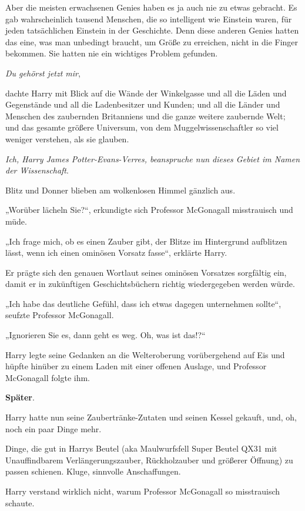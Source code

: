 {Aber die meisten erwachsenen Genies haben es ja auch nie zu etwas gebracht. Es gab wahrscheinlich tausend Menschen, die so intelligent wie Einstein waren, für jeden tatsächlichen Einstein in der Geschichte. Denn diese anderen Genies hatten das eine, was man unbedingt braucht, um Größe zu erreichen, nicht in die Finger bekommen. Sie hatten nie ein wichtiges Problem gefunden.

\emph{Du gehörst jetzt mir},

dachte Harry mit Blick auf die Wände der Winkelgasse und all die Läden und Gegenstände und all die Ladenbesitzer und Kunden; und all die Länder und Menschen des zaubernden Britanniens und die ganze weitere zaubernde Welt; und das gesamte größere Universum, von dem Muggelwissenschaftler so viel weniger verstehen, als sie glauben.

\emph{Ich, Harry James Potter-Evans-Verres, beanspruche nun dieses Gebiet im Namen der Wissenschaft}.

Blitz und Donner blieben am wolkenlosen Himmel gänzlich aus.

„Worüber lächeln Sie?“, erkundigte sich Professor McGonagall misstrauisch und müde.

„Ich frage mich, ob es einen Zauber gibt, der Blitze im Hintergrund aufblitzen lässt, wenn ich einen ominösen Vorsatz fasse“, erklärte Harry.

Er prägte sich den genauen Wortlaut seines ominösen Vorsatzes sorgfältig ein, damit er in zukünftigen Geschichtsbüchern richtig wiedergegeben werden würde.

„Ich habe das deutliche Gefühl, dass ich etwas dagegen unternehmen sollte“, seufzte Professor McGonagall.

„Ignorieren Sie es, dann geht es weg. Oh, was ist das!?“

Harry legte seine Gedanken an die Welteroberung vorübergehend auf Eis und hüpfte hinüber zu einem Laden mit einer offenen Auslage, und Professor McGonagall folgte ihm.

\textbf{Später}.

Harry hatte nun seine Zaubertränke-Zutaten und seinen Kessel gekauft, und, oh, noch ein paar Dinge mehr.

Dinge, die gut in Harrys Beutel (aka Maulwurfsfell Super Beutel QX31 mit Unauffindbarem Verlängerungszauber, Rückholzauber und größerer Öffnung) zu passen schienen. Kluge, sinnvolle Anschaffungen.

Harry verstand wirklich nicht, warum Professor McGonagall so misstrauisch schaute.

}
